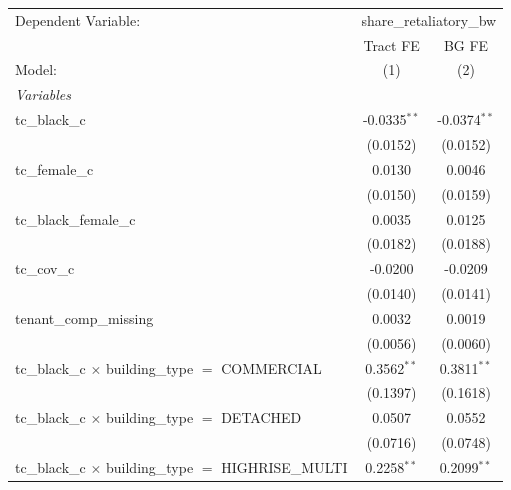 \begin{tabular}{lcc}
   \tabularnewline \midrule \midrule
   Dependent Variable: & \multicolumn{2}{c}{share\_retaliatory\_bw}\\
                                                                       & Tract FE       & BG FE \\   
   Model:                                                              & (1)            & (2)\\  
   \midrule
   \emph{Variables}\\
   tc\_black\_c                                                        & -0.0335$^{**}$ & -0.0374$^{**}$\\   
                                                                       & (0.0152)       & (0.0152)\\   
   tc\_female\_c                                                       & 0.0130         & 0.0046\\   
                                                                       & (0.0150)       & (0.0159)\\   
   tc\_black\_female\_c                                                & 0.0035         & 0.0125\\   
                                                                       & (0.0182)       & (0.0188)\\   
   tc\_cov\_c                                                          & -0.0200        & -0.0209\\   
                                                                       & (0.0140)       & (0.0141)\\   
   tenant\_comp\_missing                                               & 0.0032         & 0.0019\\   
                                                                       & (0.0056)       & (0.0060)\\   
   tc\_black\_c $\times$ building\_type $=$ COMMERCIAL                 & 0.3562$^{**}$  & 0.3811$^{**}$\\   
                                                                       & (0.1397)       & (0.1618)\\   
   tc\_black\_c $\times$ building\_type $=$ DETACHED                   & 0.0507         & 0.0552\\   
                                                                       & (0.0716)       & (0.0748)\\   
   tc\_black\_c $\times$ building\_type $=$ HIGHRISE\_MULTI            & 0.2258$^{**}$  & 0.2099$^{**}$\\   

\end{tabular}
